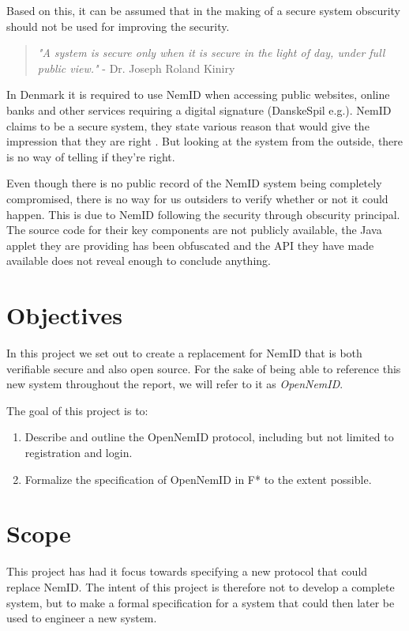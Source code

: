 \documentclass[twosided]{report}
\begin{document}
Based on this, it can be assumed that in the making of a secure system obscurity should not be used for improving the security.
\begin{quote}
\textit{"A system is secure only when it is secure in the light of day, under full public view."} - Dr. Joseph Roland Kiniry \cite{ftspeech}
\end{quote}
\par
In Denmark it is required to use NemID when accessing public websites, online banks and other services requiring a digital signature (DanskeSpil e.g.). NemID claims to be a secure system, they state various reason that would give the impression that they are right \cite{omnemidsikkerhed}. But looking at the system from the outside, there is no way of telling if they're right.
\par
Even though there is no public record of the NemID system being completely compromised, there is no way for us outsiders to verify whether or not it could happen. This is due to NemID following the security through obscurity principal. The source code for their key components are not publicly available, the Java applet they are providing has been obfuscated and the API they have made available does not reveal enough to conclude anything.

\newpage
\section{Objectives}
In this project we set out to create a replacement for NemID that is both verifiable secure and also open source. For the sake of being able to reference this new system throughout the report, we will refer to it as \emph{OpenNemID}.
\\
\par
The goal of this project is to:
\begin{enumerate}
	\item Describe and outline the OpenNemID protocol, including but not limited to registration and login.
	\item Formalize the specification of OpenNemID in F* to the extent possible.
\end{enumerate}

\section{Scope}
This project has had it focus towards specifying a new protocol that could replace NemID. The intent of this project is therefore not to develop a complete system, but to make a formal specification for a system that could then later be used to engineer a new system.
\end{document}
